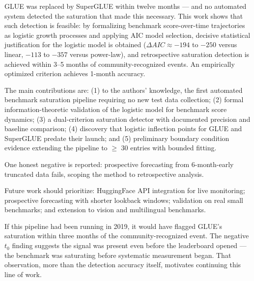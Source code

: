 
GLUE was replaced by SuperGLUE within twelve months --- and no automated system detected the saturation that made this necessary. This work shows that such detection is feasible: by formalizing benchmark score-over-time trajectories as logistic growth processes and applying AIC model selection, decisive statistical justification for the logistic model is obtained ($\Delta AIC \approx -194$ to $-250$ versus linear, $-113$ to $-357$ versus power-law), and retrospective saturation detection is achieved within 3--5 months of community-recognized events. An empirically optimized criterion achieves 1-month accuracy.

The main contributions are: (1) to the authors' knowledge, the first automated benchmark saturation pipeline requiring no new test data collection; (2) formal information-theoretic validation of the logistic model for benchmark score dynamics; (3) a dual-criterion saturation detector with documented precision and baseline comparison; (4) discovery that logistic inflection points for GLUE and SuperGLUE predate their launch; and (5) preliminary boundary condition evidence extending the pipeline to $\geq$ 30 entries with bounded fitting.

One honest negative is reported: prospective forecasting from 6-month-early truncated data fails, scoping the method to retrospective analysis.

Future work should prioritize: HuggingFace API integration for live monitoring; prospective forecasting with shorter lookback windows; validation on real small benchmarks; and extension to vision and multilingual benchmarks.

If this pipeline had been running in 2019, it would have flagged GLUE's saturation within three months of the community-recognized event. The negative $t_0$ finding suggests the signal was present even before the leaderboard opened --- the benchmark was saturating before systematic measurement began. That observation, more than the detection accuracy itself, motivates continuing this line of work.

